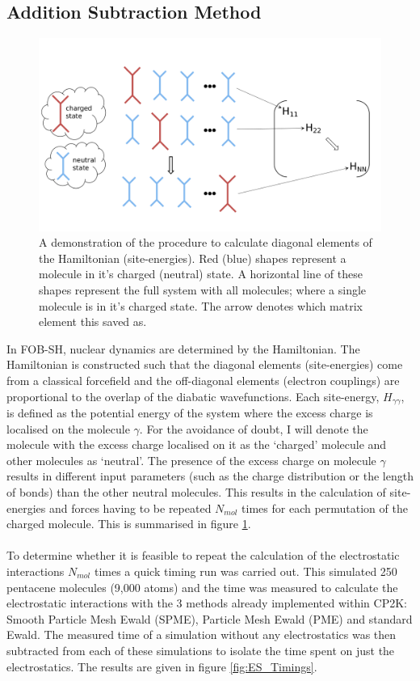 \subsection{Addition Subtraction Method}
\begin{figure}[ht]
  \includegraphics[width=\textwidth]{./img/ES/ForceEnerCalc.png}
  \caption{\label{fig:FE_Calc}A demonstration of the procedure to calculate diagonal elements of the Hamiltonian (site-energies). Red (blue) shapes represent a molecule in it's charged (neutral) state. A  horizontal line of these shapes represent the full system with all molecules; where a single molecule is in it's charged state. The arrow denotes which matrix element this saved as.}
\end{figure}
\noindent In FOB-SH, nuclear dynamics are determined by the Hamiltonian. The Hamiltonian is constructed such that the diagonal elements (site-energies) come from a classical forcefield and the off-diagonal elements (electron couplings) are proportional to the overlap of the diabatic wavefunctions. Each site-energy, $H_{\gamma \gamma}$, is defined as the potential energy of the system where the excess charge is localised on the molecule $\gamma$. For the avoidance of doubt, I will denote the molecule with the excess charge localised on it as the `charged' molecule and other molecules as `neutral'. The presence of the excess charge on molecule $\gamma$ results in different input parameters (such as the charge distribution or the length of bonds) than the other neutral molecules. This results in the calculation of site-energies and forces having to be repeated $N_{mol}$ times for each permutation of the charged molecule. This is summarised in figure \ref{fig:FE_Calc}. 
\\\\
To determine whether it is feasible to repeat the calculation of the electrostatic interactions $N_{mol}$ times a quick timing run was carried out. This simulated 250 pentacene molecules (9,000 atoms) and the time was measured to calculate the electrostatic interactions with the 3 methods already implemented within CP2K: Smooth Particle Mesh Ewald (SPME), Particle Mesh Ewald (PME) and standard Ewald. The measured time of a simulation without any electrostatics was then subtracted from each of these simulations to isolate the time spent on just the electrostatics. The results are given in figure  \ref{fig:ES_Timings}.
